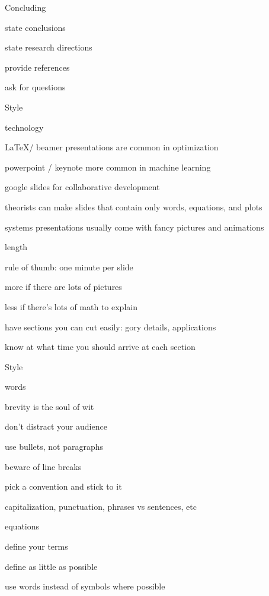 \documentclass[presentation,xcolor={usenames,dvipsnames}]{beamer}
\begin{document}
\begin{frame}{Concluding}

\bit
\item state conclusions
\item state research directions
\item provide references
\item ask for questions
\eit

\end{frame}

\begin{frame}{Style}

technology
\bit
\item \LaTeX / beamer presentations are common in optimization
\item powerpoint / keynote more common in machine learning
\item google slides for collaborative development
\item theorists can make slides that contain only words, equations, and plots
\item systems presentations usually come with fancy pictures and animations
\eit

length
\bit
\item rule of thumb: one minute per slide
\item more if there are lots of pictures
\item less if there's lots of math to explain
\item have sections you can cut easily: gory details, applications
\item know at what time you should arrive at each section
\eit
\end{frame}

\begin{frame}{Style}

words
\bit
\item brevity is the soul of wit
\item don't distract your audience
\item use bullets, not paragraphs
\item beware of line breaks
\item pick a convention and stick to it
\bit \item capitalization, punctuation, phrases vs sentences, etc \eit
\eit

equations
\bit
\item define your terms
\item define as little as possible
\item use words instead of symbols where possible
\eit
\end{frame}
\end{document}
